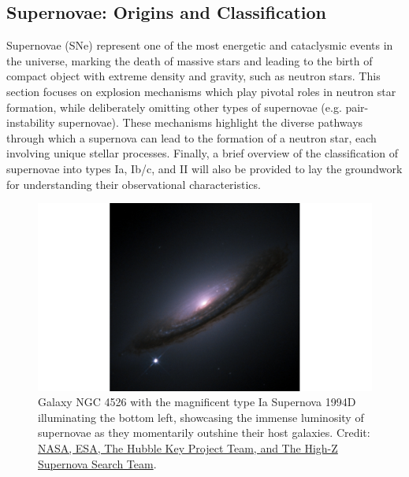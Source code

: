 \documentclass[main.tex]{subfiles}
\begin{document}
    \subsection{Supernovae: Origins and Classification}\label{sec:ch1:transients}
    Supernovae (SNe) represent one of the most energetic and cataclysmic events in the universe, marking the death of massive stars and leading to the birth of compact object with extreme density and gravity, such as neutron stars. This section focuses on explosion mechanisms which play pivotal roles in neutron star formation, while deliberately omitting other types of supernovae (e.g. pair-instability supernovae). These mechanisms highlight the diverse pathways through which a supernova can lead to the formation of a neutron star, each involving unique stellar processes. Finally, a brief overview of the classification of supernovae into types Ia, Ib/c, and II will also be provided to lay the groundwork for understanding their observational characteristics.
    \begin{figure}[t]
        \centering
        \includegraphics[scale=0.2]{figures/chapter1/SN1994D_NGC4526.png}
        \caption{Galaxy NGC 4526 with the magnificent type Ia Supernova 1994D illuminating the bottom left, showcasing the immense luminosity of supernovae as they momentarily outshine their host galaxies. Credit: \href{https://hubblesite.org/contents/media/images/1999/19/813-Image.html}{NASA, ESA, The Hubble Key Project Team, and The High-Z Supernova Search Team}.}
        \label{fig:sn1994d}
    \end{figure}
\end{document}
